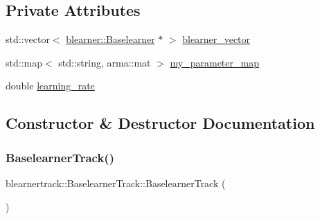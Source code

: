 \subsection*{Private Attributes}
\begin{DoxyCompactItemize}
\item 
std\+::vector$<$ \mbox{\hyperlink{classblearner_1_1_baselearner}{blearner\+::\+Baselearner}} $\ast$ $>$ \mbox{\hyperlink{classblearnertrack_1_1_baselearner_track_ad37a3a99c04778146256e50c44f2a292}{blearner\+\_\+vector}}
\item 
std\+::map$<$ std\+::string, arma\+::mat $>$ \mbox{\hyperlink{classblearnertrack_1_1_baselearner_track_a3725470c87e28ea32d4b184f1e6aad39}{my\+\_\+parameter\+\_\+map}}
\item 
double \mbox{\hyperlink{classblearnertrack_1_1_baselearner_track_a62d743fe6171c52410e2f5da3dc58ffb}{learning\+\_\+rate}}
\end{DoxyCompactItemize}


\subsection{Constructor \& Destructor Documentation}
\mbox{\label{classblearnertrack_1_1_baselearner_track_ad90a0f286fab221aa2f2ed6401861187}} 
\subsubsection{\texorpdfstring{Baselearner\+Track()}{BaselearnerTrack()}\hspace{0.1cm}{\footnotesize\ttfamily [1/2]}}
{\footnotesize\ttfamily blearnertrack\+::\+Baselearner\+Track\+::\+Baselearner\+Track (\begin{DoxyParamCaption}{ }\end{DoxyParamCaption})}

\mbox{\label{classblearnertrack_1_1_baselearner_track_aaba614b8351a3e5401d3f924059efc65}} 
